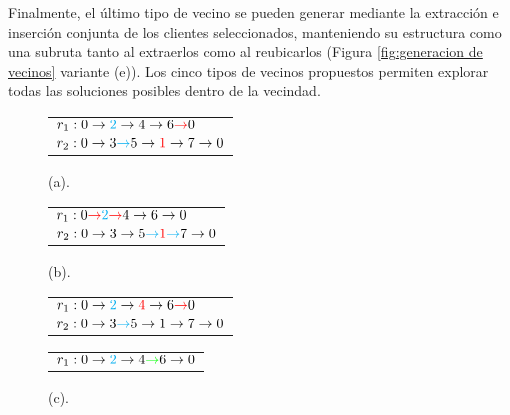 \documentclass[12pt]{report}
\begin{document}
    Finalmente, el último tipo de vecino se pueden generar mediante la extracción e inserción conjunta de los clientes seleccionados, manteniendo su estructura como una subruta tanto al extraerlos como al reubicarlos (Figura \ref{fig:generacion de vecinos} variante (e)). Los cinco tipos de vecinos propuestos permiten explorar todas las soluciones posibles dentro de la vecindad.

	\begin{figure}[!h]
		\centering
		\begin{minipage}{0.45\textwidth}
			\centering
			\begin{tabular}{l}
				$r_1:0 \rightarrow \textcolor{cyan}{2} \rightarrow 4 \rightarrow 6 \textcolor{red}{\rightarrow} 0$ \\
				$r_2:0 \rightarrow 3 \textcolor{cyan}{\rightarrow} 5 \rightarrow \textcolor{red}{1} \rightarrow 7 \rightarrow 0$ \\
			\end{tabular}
			\caption*{(a).}
		\end{minipage}%
		\hfill
		\begin{minipage}{0.45\textwidth}
			\centering
			\begin{tabular}{l}
				$r_1:0 \textcolor{red}{\rightarrow} \textcolor{cyan}{2} \textcolor{red}{\rightarrow} 4 \rightarrow 6 \rightarrow 0$ \\
				$r_2:0 \rightarrow 3 \rightarrow 5 \textcolor{cyan}{\rightarrow} \textcolor{red}{1} \textcolor{cyan}{\rightarrow} 7 \rightarrow 0$ \\
			\end{tabular}
			\caption*{(b).}
		\end{minipage}%
		\vspace{0.5cm}
		\begin{minipage}{0.45\textwidth}
			\centering
			\begin{tabular}{l}
				$r_1:0 \rightarrow \textcolor{cyan}{2} \rightarrow \textcolor{red}{4} \rightarrow 6 \textcolor{red}{\rightarrow} 0$ \\
				$r_2:0 \rightarrow 3 \textcolor{cyan}{\rightarrow} 5 \rightarrow 1 \rightarrow 7 \rightarrow 0$ \\
			\end{tabular}
			\caption*{(c).}
		\end{minipage}
		\hfill
		\begin{minipage}{0.45\textwidth}
			\centering
			\begin{tabular}{l}
				$r_1:0 \rightarrow \textcolor{cyan}{2} \rightarrow 4 \textcolor{green}{\rightarrow} 6 \rightarrow 0$ \\

\end{tabular}
\end{minipage}
\end{figure}
\end{document}
